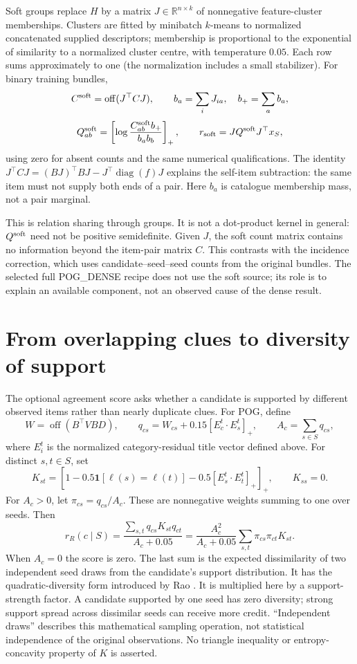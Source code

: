 \documentclass[11pt,a4paper]{article}
\newcommand{\diag}{\operatorname{diag}}
\newcommand{\off}{\operatorname{off}}
\begin{document}
Soft groups replace $H$ by a matrix $J\in\mathbb R^{n\times k}$ of
nonnegative feature-cluster memberships. Clusters are fitted by minibatch
$k$-means to normalized concatenated supplied descriptors; membership is
proportional to the exponential of similarity to a normalized cluster centre,
with temperature $0.05$. Each row sums approximately to one (the normalization
includes a small stabilizer). For binary training bundles,
\[
 C^{\rm soft}=\off(J^\top C J),\qquad b_a=\sum_iJ_{ia},\quad b_+=\sum_a b_a,
\]
\[
 Q^{\rm soft}_{ab}=
 \left[\log\frac{C^{\rm soft}_{ab}b_+}{b_a b_b}\right]_+,
 \qquad r_{\rm soft}=JQ^{\rm soft}J^\top x_S,
\]
using zero for absent counts and the same numerical qualifications.
The identity $J^\top C J=(BJ)^\top BJ-J^\top\diag(f)J$ explains the
self-item subtraction: the same item must not supply both ends of a pair.
Here $b_a$ is catalogue membership mass, not a pair marginal.

This is relation sharing through groups. It is not a dot-product kernel in
general: $Q^{\rm soft}$ need not be positive semidefinite. Given $J$, the
soft count matrix contains no information beyond the item-pair matrix $C$.
This contrasts with the incidence correction, which uses candidate--seed--seed
counts from the original bundles. The selected full POG\_DENSE recipe does
not use the soft source; its role is to explain an available component, not
an observed cause of the dense result.

\section{From overlapping clues to diversity of support}
The optional agreement score asks whether a candidate is supported by different
observed items rather than nearly duplicate clues. For POG, define
\[
 W=\off(B^\top VBD),\qquad
 q_{cs}=W_{cs}+0.15[E_c^t\!\cdot E_s^t]_+,\qquad A_c=\sum_{s\in S}q_{cs},
\]
where $E_i^t$ is the normalized category-residual title vector defined above.
For distinct $s,t\in S$, set
\[
 K_{st}=\left[1-0.5\mathbf1[\ell(s)=\ell(t)]
                  -0.5[E_s^t\!\cdot E_t^t]_+\right]_+,\qquad K_{ss}=0.
\]
For $A_c>0$, let $\pi_{cs}=q_{cs}/A_c$. These are nonnegative weights summing
to one over seeds. Then
\begin{equation}
 r_R(c\mid S)=\frac{\sum_{s,t}q_{cs}K_{st}q_{ct}}{A_c+0.05}
 =\frac{A_c^2}{A_c+0.05}\sum_{s,t}\pi_{cs}\pi_{ct}K_{st}.
\end{equation}
When $A_c=0$ the score is zero. The last sum is the expected dissimilarity
of two independent seed draws from the candidate's support distribution.
It has the quadratic-diversity form introduced by Rao \cite{rao}.
It is multiplied here by a support-strength factor. A candidate supported by
one seed has zero diversity; strong support spread across dissimilar seeds
can receive more credit. ``Independent draws'' describes this mathematical
sampling operation, not statistical independence of the original observations.
No triangle inequality or entropy-concavity property of $K$ is asserted.
\end{document}

